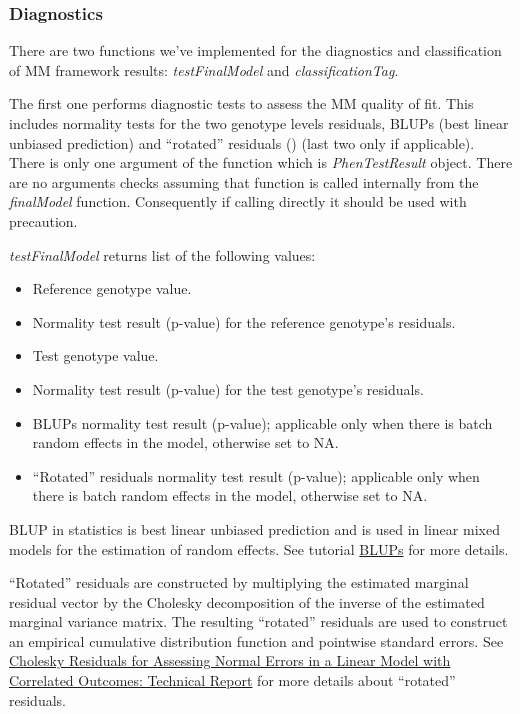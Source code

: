 \documentclass[12pt,a4paper]{article}
\begin{document}
\subsubsection{Diagnostics}
\label{Diagnostics}
There are two functions we've implemented for the diagnostics and classification of MM framework results: \textit{testFinalModel} and \textit{classificationTag}.
 
The first one performs diagnostic tests to assess the MM quality of fit. This includes normality tests for the two genotype levels residuals, BLUPs (best linear unbiased prediction) and 
``rotated'' residuals (\cite{RotatedResiduals04}) (last two only if applicable). There is only one argument of the function which is \textit{PhenTestResult} object. There are no arguments checks assuming that 
function is called internally from the \textit{finalModel} function. Consequently if calling directly it should be used with precaution. 

 \textit{testFinalModel} returns list of the following values:
 \begin{itemize}
  \item Reference genotype value.
  \item Normality test result (p-value) for the reference genotype's residuals.
  \item Test genotype value.
  \item Normality test result (p-value) for the test genotype's residuals.
  \item BLUPs normality test result (p-value); applicable only when there is batch random effects in the model, otherwise set to NA.
  \item ``Rotated'' residuals normality test result (p-value); applicable only when there is batch random effects in the model, otherwise set to NA.
 \end{itemize}

BLUP in statistics is best linear unbiased prediction and is used in linear mixed models for the estimation of random effects. 
See tutorial \href{http://www.extension.org/pages/61006/the-solcap-tomato-phenotypic-data:-estimating-heritability-and-blups-for-traits#.Ui4zjWRgYXc}{BLUPs} for more details.

``Rotated'' residuals are constructed by multiplying the estimated marginal residual vector by
the Cholesky decomposition of the inverse of the estimated marginal variance
matrix. The resulting ``rotated'' residuals are used to construct an empirical cumulative distribution function and pointwise standard errors. See
\href{http://biostats.bepress.com/cgi/viewcontent.cgi?article=1019&context=harvardbiostat}{Cholesky Residuals for Assessing Normal
Errors in a Linear Model with Correlated
Outcomes: Technical Report} for more details about ``rotated'' residuals.
\end{document}
